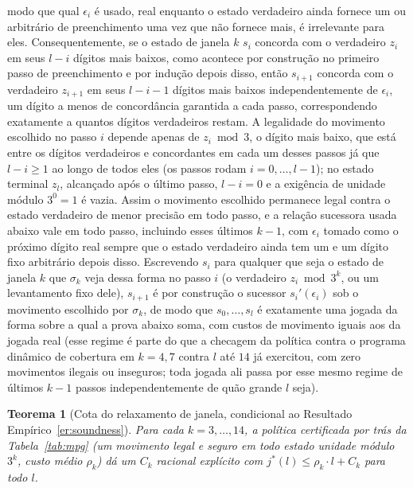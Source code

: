 \documentclass[11pt]{amsart}
\theoremstyle{plain}
\newtheorem{theorem}{Teorema}
\theoremstyle{definition}
\theoremstyle{remark}
\begin{document}
modo que qual $\epsilon_i$ é usado, real enquanto o estado verdadeiro ainda fornece um ou
arbitrário de preenchimento uma vez que não fornece mais, é irrelevante para eles. Consequentemente,
se o estado de janela $k$ $s_i$ concorda com o verdadeiro $z_i$ em seus $l-i$ dígitos mais baixos,
como acontece por construção no primeiro passo de preenchimento e por indução depois disso, então
$s_{i+1}$ concorda com o verdadeiro $z_{i+1}$ em seus $l-i-1$ dígitos mais baixos independentemente
de $\epsilon_i$, um dígito a menos de concordância garantida a cada passo, correspondendo
exatamente a quantos dígitos verdadeiros restam. A legalidade do movimento escolhido no passo $i$
depende apenas de $z_i\bmod3$, o dígito mais baixo, que está entre os dígitos verdadeiros e
concordantes em cada um desses passos já que $l-i\ge1$ ao longo de todos eles (os passos rodam
$i=0,\dots,l-1$); no estado terminal $z_l$, alcançado após o último passo, $l-i=0$ e a exigência de
unidade módulo $3^0=1$ é vazia. Assim o movimento escolhido permanece legal contra o estado
verdadeiro de menor precisão em todo passo, e a relação sucessora usada abaixo vale em todo passo,
incluindo esses últimos $k-1$, com $\epsilon_i$ tomado como o próximo dígito real sempre que o
estado verdadeiro ainda tem um e um dígito fixo arbitrário depois disso. Escrevendo $s_i$ para
qualquer que seja o estado de janela $k$ que $\sigma_k$ veja dessa forma no passo $i$ (o verdadeiro
$z_i\bmod3^k$, ou um levantamento fixo dele), $s_{i+1}$ é por construção o sucessor $s_i'(\epsilon_i)$
sob o movimento escolhido por $\sigma_k$, de modo que $s_0,\dots,s_l$ é exatamente uma jogada da
forma sobre a qual a prova abaixo soma, com custos de movimento iguais aos da jogada real (esse
regime é parte do que a checagem da política contra o programa dinâmico de cobertura em $k=4,7$
contra $l$ até $14$ já exercitou, com zero movimentos ilegais ou inseguros; toda jogada ali passa
por esse mesmo regime de últimos $k-1$ passos independentemente de quão grande $l$ seja).

\begin{theorem}[Cota do relaxamento de janela, condicional ao Resultado Empírico~\ref{er:soundness}]
\label{thm:mpg}
Para cada $k=3,\dots,14$, a política certificada por trás da Tabela~\ref{tab:mpg} (um movimento
legal e seguro em todo estado unidade módulo $3^k$, custo médio $\rho_k$) dá um $C_k$ racional
explícito com $j^*(l) \le \rho_k\cdot l + C_k$ para todo $l$.
\end{theorem}
\end{document}

